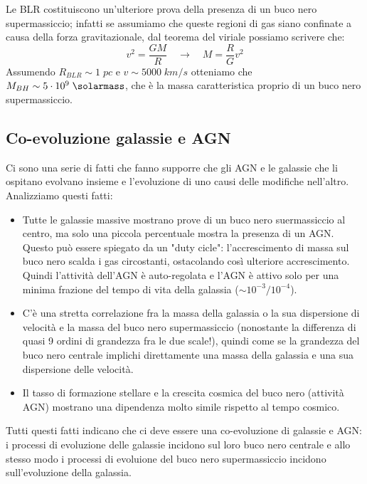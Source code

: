 Le BLR costituiscono un'ulteriore prova della presenza di un buco nero supermassiccio; infatti se assumiamo che queste regioni di gas siano confinate a causa della forza gravitazionale, dal teorema del viriale possiamo scrivere che:
\begin{equation*}
    v^2 = \frac{GM}{R} \quad \rightarrow \quad M = \frac{R}{G} v^2
\end{equation*}
Assumendo $R_{BLR}\sim 1 \;\si{pc}$ e $v \sim 5000 \;\si{km}/\si{s}$ otteniamo che $M_{BH} \sim 5 \cdot 10^9 \;\si{\solarmass}$, che è la massa caratteristica proprio di un buco nero supermassiccio.

\subsection{Co-evoluzione galassie e AGN} \label{co-evoluzione-galassie-agn}
Ci sono una serie di fatti che fanno supporre che gli AGN e le galassie che li ospitano evolvano insieme e l'evoluzione di uno causi delle modifiche nell'altro. Analizziamo questi fatti:
\begin{itemize}
    \item Tutte le galassie massive mostrano prove di un buco nero suermassiccio al centro, ma solo una piccola percentuale mostra la presenza di un AGN. Questo può essere spiegato da un "duty cicle": l'accrescimento di massa sul buco nero scalda i gas circostanti, ostacolando così ulteriore accrescimento. Quindi l'attività dell'AGN è auto-regolata e l'AGN è attivo solo per una minima frazione del tempo di vita della galassia ($\sim 10^{-3}/10^{-4}$).
    \item C'è una stretta correlazione fra la massa della galassia o la sua dispersione di velocità e la massa del buco nero supermassiccio (nonostante la differenza di quasi 9 ordini di grandezza fra le due scale!), quindi come se la grandezza del buco nero centrale implichi direttamente una massa della galassia e una sua dispersione delle velocità.
    \item Il tasso di formazione stellare e la crescita cosmica del buco nero (attività AGN) mostrano una dipendenza molto simile rispetto al tempo cosmico.
\end{itemize}

Tutti questi fatti indicano che ci deve essere una co-evoluzione di galassie e AGN: i processi di evoluzione delle galassie incidono sul loro buco nero centrale e allo stesso modo i processi di evoluione del buco nero supermassiccio incidono sull'evoluzione della galassia.

